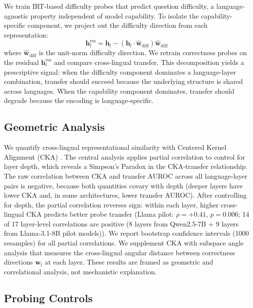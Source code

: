 We train IRT-based difficulty probes that predict question difficulty, a language-agnostic property independent of model capability. To isolate the capability-specific component, we project out the difficulty direction from each representation:
\begin{equation}
  \mathbf{h}_l^{\text{res}} = \mathbf{h}_l - (\mathbf{h}_l \cdot \hat{\mathbf{w}}_{\text{diff}})\hat{\mathbf{w}}_{\text{diff}}
  \label{eq:residual}
\end{equation}
where $\hat{\mathbf{w}}_{\text{diff}}$ is the unit-norm difficulty direction. We retrain correctness probes on the residual $\mathbf{h}_l^{\text{res}}$ and compare cross-lingual transfer. This decomposition yields a prescriptive signal: when the difficulty component dominates a language-layer combination, transfer should succeed because the underlying structure is shared across languages. When the capability component dominates, transfer should degrade because the encoding is language-specific.

\subsection{Geometric Analysis}
\label{sec:geometric}

We quantify cross-lingual representational similarity with Centered Kernel Alignment (CKA) \citep{kornblith2019cka}.
The central analysis applies partial correlation to control for layer depth, which reveals a Simpson's Paradox in the CKA-transfer relationship. The raw correlation between CKA and transfer AUROC across all language-layer pairs is negative, because both quantities covary with depth (deeper layers have lower CKA and, in some architectures, lower transfer AUROC). After controlling for depth, the partial correlation reverses sign: within each layer, higher cross-lingual CKA predicts better probe transfer (Llama pilot: $\rho = +0.41$, $p = 0.006$; 14 of 17 layer-level correlations are positive (8 layers from Qwen2.5-7B + 9 layers from Llama-3.1-8B pilot models)). We report bootstrap confidence intervals (1000 resamples) for all partial correlations. We supplement CKA with subspace angle analysis that measures the cross-lingual angular distance between correctness directions $\mathbf{w}_l$ at each layer. These results are framed as geometric and correlational analysis, not mechanistic explanation.

\subsection{Probing Controls}
\label{sec:controls}

